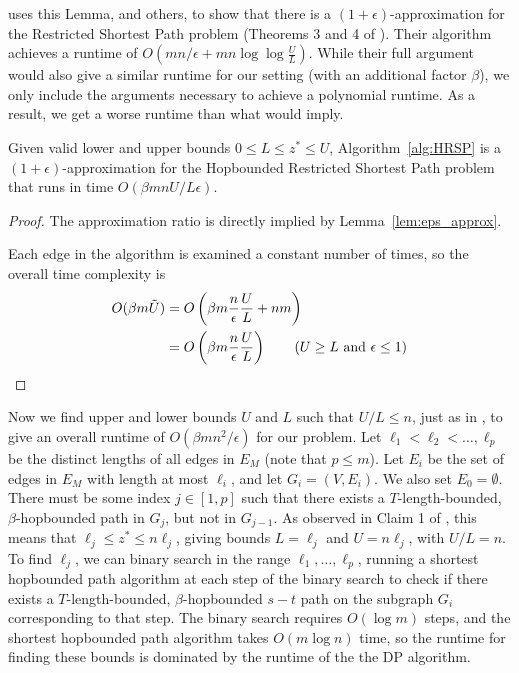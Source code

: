 \cite{LR01} uses this Lemma, and others, to show that there is a $(1+\epsilon)$-approximation for the Restricted Shortest Path problem (Theorems 3 and 4 of \cite{LR01}). Their algorithm achieves a runtime of $O(m n/ \epsilon + m n \log \log \frac{U}{L})$. While their full argument would also give a similar runtime for our setting (with an additional factor $\beta$), we only include the arguments necessary to achieve a polynomial runtime. As a result, we get a worse runtime than what \cite{LR01} would imply. 

\begin{lemma} \label{lem:AS}
    Given valid lower and upper bounds $0 \leq L \leq z^* \leq U$, Algorithm~\ref{alg:HRSP} is a $(1+\epsilon)$-approximation for the Hopbounded Restricted Shortest Path problem that runs in time $O(\beta m n U / L \epsilon)$. 
\end{lemma}
\begin{proof}
The approximation ratio is directly implied by Lemma~\ref{lem:eps_approx}. 
    
Each edge in the algorithm is examined a constant number of times, so the overall time complexity is 
\begin{align*}
    O(\beta m \Tilde{U}) &= O\left( \beta m \frac{n}{\epsilon} \frac{U}{L} + nm \right) \\
    &= O\left( \beta m \frac{n}{\epsilon} \frac{U}{L}  \right) \tag{$U \geq L$ and $\epsilon \leq 1$}
\end{align*}
\end{proof}

Now we find upper and lower bounds $U$ and $L$ such that $U/L \leq n$, just as in \cite{LR01}, to give an overall runtime of $O(\beta m n^2 / \epsilon)$ for our problem. Let $\ell_1 < \ell_2 < \dots, \ell_p$ be the distinct lengths of all edges in $E_M$ (note that $p \leq m$). Let $E_i$ be the set of edges in $E_M$ with length at most $\ell_i$, and let $G_i = (V, E_i)$. We also set $E_0 = \emptyset$.
There must be some index $j \in [1,p]$ such that there exists a $T$-length-bounded, $\beta$-hopbounded path in $G_j$, but not in $G_{j-1}$. As observed in Claim 1 of \cite{LR01}, this means that $\ell_j \leq z^* \leq n \ell_j$, giving bounds $L = \ell_j$ and $U = n \ell_j$, with $U/L = n$. To find $\ell_j$, we can binary search in the range $\ell_1, \dots, \ell_p$, running a shortest hopbounded path algorithm at each step of the binary search to check if there exists a $T$-length-bounded, $\beta$-hopbounded $s-t$ path on the subgraph $G_i$ corresponding to that step. The binary search requires $O(\log m)$ steps, and the shortest hopbounded path algorithm takes $O(m \log n)$ time, so the runtime for finding these bounds is dominated by the runtime of the the DP algorithm. 

